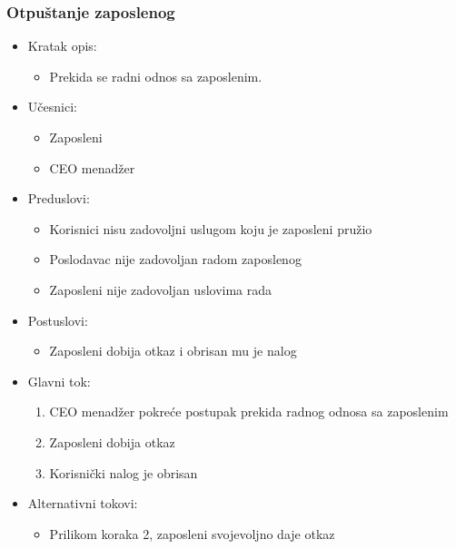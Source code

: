\documentclass[a4paper]{article}
\begin{document}
\subsubsection{Otpuštanje zaposlenog}
\begin{itemize}
    \item Kratak opis: 
    \begin{itemize}
        \item Prekida se radni odnos sa zaposlenim.
    \end{itemize}
    \item Učesnici:
        \begin{itemize}
        \item Zaposleni
        \item CEO menadžer
    \end{itemize}
    \item Preduslovi:
        \begin{itemize}
            \item Korisnici nisu zadovoljni uslugom koju je zaposleni pružio
            \item Poslodavac nije zadovoljan radom zaposlenog
            \item Zaposleni nije zadovoljan uslovima rada
        \end{itemize}
    \item Postuslovi:
        \begin{itemize}
            \item Zaposleni dobija otkaz i obrisan mu je nalog
        \end{itemize}
    \item Glavni tok:
        \begin{enumerate}
            \item CEO menadžer pokreće postupak prekida radnog odnosa sa zaposlenim
            \item Zaposleni dobija otkaz
            \item Korisnički nalog je obrisan
        \end{enumerate}
    \item Alternativni tokovi:
        \begin{itemize}
            \item Prilikom koraka 2, zaposleni svojevoljno daje otkaz
        \end{itemize}
\end{itemize}
\end{document}
